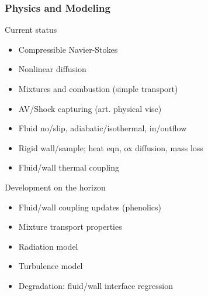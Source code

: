 \begin{frame}\frametitle{Physics and Modeling}
\begin{center}
Current status
\end{center}
\begin{multicols}{2}
\begin{itemize}
\item Compressible Navier-Stokes
\item Nonlinear diffusion
\item Mixtures and combustion (simple transport)
\item AV/Shock capturing (art. physical visc)
\item Fluid no/slip, adiabatic/isothermal, in/outflow
\item Rigid wall/sample; heat eqn, ox diffusion, mass loss
\item Fluid/wall thermal coupling
\end{itemize}
\end{multicols}
\begin{center}
Development on the horizon
\end{center}
\begin{multicols}{2}
\begin{itemize}
\item Fluid/wall coupling updates (phenolics)
\item Mixture transport properties
\item Radiation model
\item Turbulence model
\item Degradation: fluid/wall interface regression
\end{itemize}
\end{multicols}
\end{frame}

